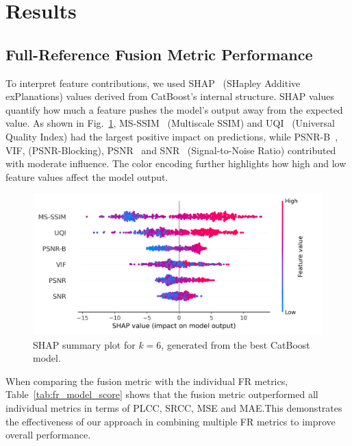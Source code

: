 \section{Results}

\subsection{Full-Reference Fusion Metric Performance}


To interpret feature contributions, we used SHAP~\cite{shap} (SHapley Additive exPlanations) values derived from CatBoost's internal structure. SHAP values quantify how much a feature pushes the model's output away from the expected value. As shown in Fig.~\ref{fig:shap_summary}, MS-SSIM~\cite{wang2003multiscale} (Multiscale SSIM) and UQI~\cite{wang2004ssim} (Universal Quality Index) had the largest positive impact on predictions, while PSNR-B~\cite{ma2011psnr}, VIF\cite{sheikh2006image}, (PSNR-Blocking), PSNR~\cite{pnsr2003} and SNR~\cite{gonzalez2002digital} (Signal-to-Noise Ratio) contributed with moderate influence. The color encoding further highlights how high and low feature values affect the model output.

\begin{figure}
    \centering
    \includegraphics[width=0.7\linewidth]{images/shap_summary.png}
    \caption{SHAP summary plot for $k=6$, generated from the best CatBoost model.}\label{fig:shap_summary}
\end{figure}

When comparing the fusion metric with the individual FR metrics, Table~\ref{tab:fr_model_score} shows that the fusion metric outperformed all individual metrics in terms of PLCC, SRCC, MSE and MAE.\@ This demonstrates the effectiveness of our approach in combining multiple FR metrics to improve overall performance.


